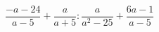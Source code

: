 \begin{ex}[type=expression]
	\begin{condition}
		\( \dfrac{-a-24}{a-5}+\dfrac{a}{a+5}:\dfrac{a}{a^2-25}+\dfrac{6a-1}{a-5} \)
	\end{condition}
\end{ex}
